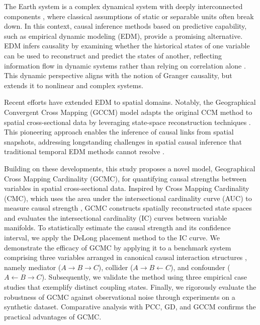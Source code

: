 \documentclass[authoryear,preprint,review,12pt]{elsarticle}
\begin{document}
The Earth system is a complex dynamical system with deeply interconnected components \citep{runge2019esstsc,runge2023tsc}, where classical assumptions of static or separable units often break down. In this context, causal inference methods based on predictive capability, such as empirical dynamic modeling (EDM), provide a promising alternative. EDM infers causality by examining whether the historical states of one variable can be used to reconstruct and predict the states of another, reflecting information flow in dynamic systems rather than relying on correlation alone \citep{sugihara2012ccm,leng2020pcm,tao2023cmc}. This dynamic perspective aligns with the notion of Granger causality, but extends it to nonlinear and complex systems.

Recent efforts have extended EDM to spatial domains. Notably, the Geographical Convergent Cross Mapping (GCCM) model adapts the original CCM method \citep{sugihara2012ccm} to spatial cross-sectional data by leveraging state-space reconstruction techniques \citep{lorenz1969ssr,Takens1981embedding,Mane1981embedding}. This pioneering approach enables the inference of causal links from spatial snapshots, addressing longstanding challenges in spatial causal inference that traditional temporal EDM methods cannot resolve \citep{gao2022tscess,gao2023gccm}.

Building on these developments, this study proposes a novel model, Geographical Cross Mapping Cardinality (GCMC), for quantifying causal strengths between variables in spatial cross-sectional data. Inspired by Cross Mapping Cardinality (CMC), which uses the area under the intersectional cardinality curve (AUC) to measure causal strength \citep{tao2023cmc}, GCMC constructs spatially reconstructed state spaces and evaluates the intersectional cardinality (IC) curves between variable manifolds. To statistically estimate the causal strength and its confidence interval, we apply the DeLong placement method \citep{delong1988,sun2014delongfi} to the IC curve. We demonstrate the efficacy of GCMC by applying it to a benchmark system comprising three variables arranged in canonical causal interaction structures \citep{sanchez2024surd}, namely mediator (\(A \rightarrow B \rightarrow C\)), collider (\(A \rightarrow B \leftarrow C\)), and confounder (\(A \leftarrow B \rightarrow C\)). Subsequently, we validate the method using three empirical case studies that exemplify distinct coupling states. Finally, we rigorously evaluate the robustness of GCMC against observational noise through experiments on a synthetic dataset. Comparative analysis with PCC, GD, and GCCM confirms the practical advantages of GCMC.
\end{document}
